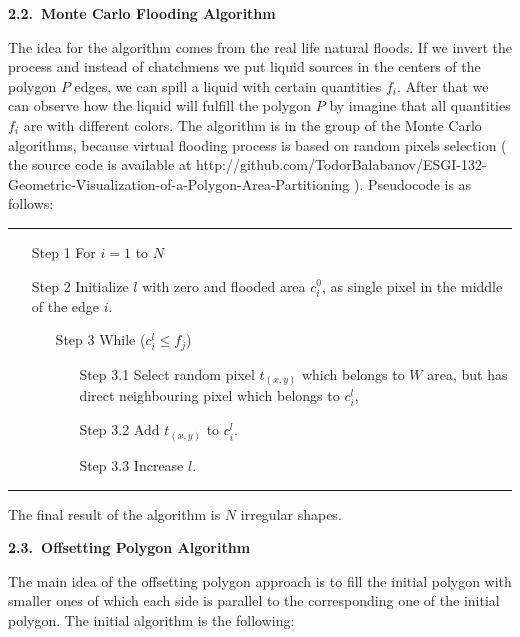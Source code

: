\documentclass[11pt,leqno]{book}
\newcommand{\subsect}[1]{\vskip 3mm\par{\bf#1}}
\begin{document}
\subsect{2.2.~Monte Carlo Flooding Algorithm}

The idea for the algorithm comes from the real life natural floods. If we invert the process and instead of chatchmens we put liquid sources in the centers of the polygon $P$ edges, we can spill a liquid with certain quantities $f_i$. After that we can observe how the liquid will fulfill the polygon $P$ by imagine that all quantities $f_i$ are with different colors. The algorithm is in the group of the Monte Carlo algorithms, because virtual flooding process is based on random pixels selection ( the source code is available at http://github.com/TodorBalabanov/ESGI-132-Geometric-Visualization-of-a-Polygon-Area-Partitioning ). Pseudocode is as follows:

\newpage
\noindent\rule{\textwidth}{1pt}
\begin{itemize}
\item[Step 1] For $i = 1$ to $N$
\item[Step 2] Initialize $l$ with zero and flooded area $c_i^0$, as single pixel in the middle of the edge $i$.
	\begin{itemize}
	\item[Step 3] While ($c_i^l \leq f_j$)
		\begin{itemize}
		\item[Step 3.1] Select random pixel $t_{(x,y)}$ which belongs to $W$ area, but has direct neighbouring pixel which belongs to $c_i^l$,
		\item[Step 3.2] Add $t_{(x,y)}$ to $c_i^l$.
		\item[Step 3.3] Increase $l$.
		\end{itemize}
	\end{itemize}
\end{itemize}
\noindent\rule{\textwidth}{1pt}

The final result of the algorithm is $N$ irregular shapes.

\subsect{2.3.~Offsetting Polygon Algorithm}

The main idea of the offsetting polygon approach is to fill the initial polygon with smaller ones of which each side is parallel to the corresponding one of the initial polygon. The initial algorithm is the following:
\end{document}
